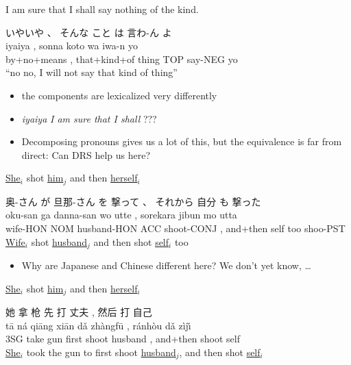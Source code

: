 \documentclass[a4paper,landscape,headrule,footrule,xetex]{foils}
\begin{document}
\begin{exe}
\ex I am sure that I shall say nothing of the kind.
\begin{xlist}
\ex  \glll いやいや 、 そんな  こと は 言わ-ん よ \\
iyaiya , sonna  koto wa iwa-n yo \\
by+no+means , that+kind+of thing TOP say-NEG yo \\
\trans ``no no, I will not say that kind of thing''
\end{xlist}
\end{exe}
\begin{itemize} \addtolength{\itemsep}{-.5ex}
\item the components are lexicalized very differently
\item \textit{iyaiya} \tot \textit{I am sure that I shall} ???
\item Decomposing pronouns gives us a lot of this, but the equivalence
  is far from direct: Can DRS help us here?
\end{itemize}
\begin{exe}
\ex \ul{She}$_i$ shot \ul{him}$_j$ and then \ul{herself}$_i$
\begin{xlist}
\ex \glll 奥-さん が 旦那-さん を 撃って 、 それから 自分 も 撃った \\
oku-san ga danna-san wo utte , sorekara jibun mo utta \\
wife-HON NOM husband-HON ACC shoot-CONJ , and+then self too shoo-PST \\
\trans \ul{Wife}$_i$ shot \ul{husband}$_j$ and then shot \ul{self}$_i$ too
\end{xlist}
\end{exe}

\begin{itemize}
\item Why are Japanese and Chinese different here?  We don't yet know, \ldots
\end{itemize}

\begin{exe}
\ex \ul{She}$_i$ shot \ul{him}$_j$ and then \ul{herself}$_i$
\begin{xlist}
\ex  \glll 她 拿 枪  先 打 丈夫 , 然后 打 自己\\
t\={a} ná qi\={a}ng xi\={a}n d\v{a} zhàngf\={u} , ránh\`{o}u d\v{a} zìj\v{\i} \\
3SG take gun first shoot husband , and+then shoot self\\
\trans \ul{She}$_i$ took the gun to first shoot \ul{husband}$_j$, and then shot \ul{self}$_i$
\end{xlist}
\end{exe}
\end{document}
